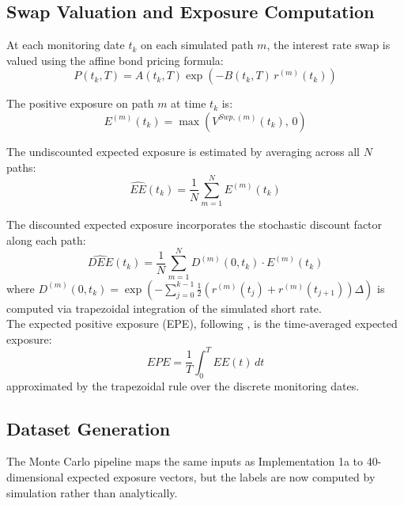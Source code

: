   \subsection{Swap Valuation and Exposure Computation}

  At each monitoring date $t_k$ on each simulated path $m$, the interest rate swap is valued using the affine bond pricing formula:
  \begin{equation}
      P(t_k, T) = A(t_k, T)\exp\!\left(-B(t_k, T)\, r^{(m)}(t_k)\right)
  \end{equation}

  \noindent
  The positive exposure on path $m$ at time $t_k$ is:
  \begin{equation}
      E^{(m)}(t_k) = \max\!\left(V^{Swp,(m)}(t_k),\, 0\right)
  \end{equation}

  \noindent
  The undiscounted expected exposure is estimated by averaging across all $N$ paths:
  \begin{equation}
      \widehat{EE}(t_k) = \frac{1}{N}\sum_{m=1}^{N} E^{(m)}(t_k)
  \end{equation}

  \noindent
  The discounted expected exposure incorporates the stochastic discount factor along each path:
  \begin{equation}
      \widehat{DEE}(t_k) = \frac{1}{N}\sum_{m=1}^{N} D^{(m)}(0, t_k) \cdot E^{(m)}(t_k)
  \end{equation}
  where $D^{(m)}(0, t_k) = \exp\!\left(-\sum_{j=0}^{k-1} \frac{1}{2}(r^{(m)}(t_j) + r^{(m)}(t_{j+1}))\Delta\right)$ is computed via trapezoidal integration of the simulated short rate. \\
  
  \noindent
  The expected positive exposure (EPE), following \cite{Gregory_2015}, is the time-averaged expected exposure:
  \begin{equation}
      EPE = \frac{1}{T} \int_0^T EE(t)\, dt
  \end{equation}
  approximated by the trapezoidal rule over the discrete monitoring dates.

  \subsection{Dataset Generation}

  The Monte Carlo pipeline maps the same inputs as Implementation 1a to 40-dimensional expected exposure vectors, but the labels are now computed by simulation rather than analytically.

